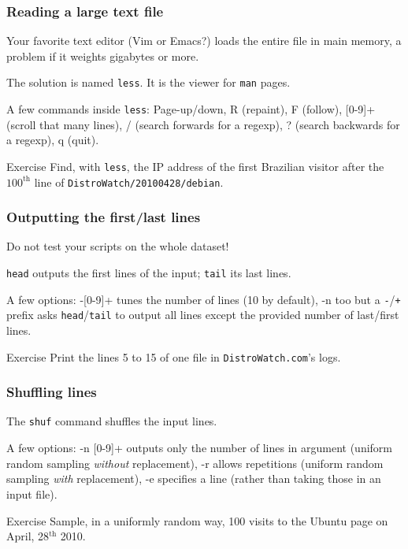 \documentclass{beamer}
\begin{document}
\begin{frame}
  \frametitle{Reading a large text file}
  Your favorite text editor (Vim or Emacs?) loads the entire file in
  main memory, a problem if it weights gigabytes or more.

  \vfill
  \pause

  The solution is named \texttt{less}. It is the viewer for
  \texttt{man} pages.

  \vfill

  A few commands inside \texttt{less}: Page-up/down, R (repaint), F
  (follow), [0-9]+ (scroll that many lines), / (search forwards for a
  regexp), ? (search backwards for a regexp), q (quit).

  \vfill
  \pause

  \begin{exampleblock}{Exercise}
    Find, with \texttt{less}, the IP address of the first Brazilian
    visitor after the $100^{\text{th}}$ line of
    \texttt{DistroWatch/20100428/debian}.
  \end{exampleblock}
\end{frame}

\begin{frame}
  \frametitle{Outputting the first/last lines}
  Do not test your scripts on the whole dataset!

  \vfill

  \texttt{head} outputs the first lines of the input; \texttt{tail}
  its last lines.

  \vfill

  A few options: -[0-9]+ tunes the number of lines (10 by default), -n
  too but a \texttt{-}/\texttt{+} prefix asks
  \texttt{head}/\texttt{tail} to output all lines except the provided
  number of last/first lines.

  \vfill
  \pause

  \begin{exampleblock}{Exercise}
    Print the lines 5 to 15 of one file in \texttt{DistroWatch.com}'s
    logs.
  \end{exampleblock}
\end{frame}

\begin{frame}
  \frametitle{Shuffling lines}
  The \texttt{shuf} command shuffles the input lines.

  \vfill

  A few options: -n [0-9]+ outputs only the number of lines in
  argument (uniform random sampling \emph{without} replacement), -r
  allows repetitions (uniform random sampling \emph{with}
  replacement), -e specifies a line (rather than taking those in an
  input file).

  \vfill
  \pause

  \begin{exampleblock}{Exercise}
    Sample, in a uniformly random way, 100 visits to the Ubuntu page
    on April, 28$^{\text{th}}$ 2010.
  \end{exampleblock}
\end{frame}
\end{document}
